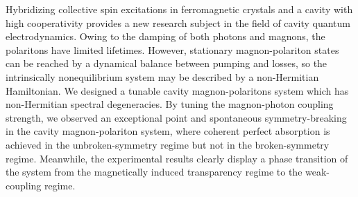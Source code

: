 Hybridizing collective spin excitations in ferromagnetic crystals and a cavity with high cooperativity provides a new research subject in the field of cavity quantum electrodynamics\cite{1-5}. Owing to the damping of both photons and magnons, the polaritons have limited lifetimes. However, stationary magnon-polariton states can be reached by a dynamical balance between pumping and losses, so the intrinsically nonequilibrium system may be described by a non-Hermitian Hamiltonian. We designed a tunable cavity magnon-polaritons system which has non-Hermitian spectral degeneracies. By tuning the magnon-photon coupling strength, we observed an exceptional point and spontaneous symmetry-breaking in the cavity magnon-polariton system, where coherent perfect absorption is achieved in the unbroken-symmetry regime but not in the broken-symmetry regime. Meanwhile, the experimental results clearly display a phase transition of the system from the magnetically induced transparency regime to the weak-coupling regime\cite{6}.